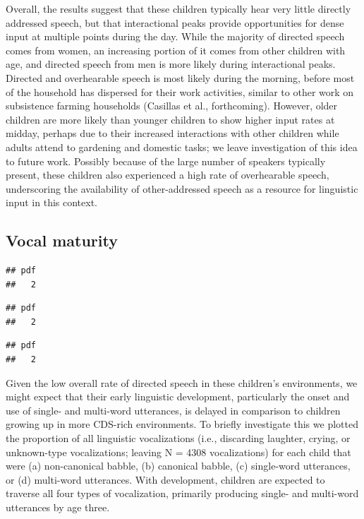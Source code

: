 \documentclass[,man,floatsintext]{apa6}
\begin{document}
Overall, the results suggest that these children typically hear very
little directly addressed speech, but that interactional peaks provide
opportunities for dense input at multiple points during the day. While
the majority of directed speech comes from women, an increasing portion
of it comes from other children with age, and directed speech from men
is more likely during interactional peaks. Directed and overhearable
speech is most likely during the morning, before most of the household
has dispersed for their work activities, similar to other work on
subsistence farming households (Casillas et al., forthcoming). However,
older children are more likely than younger children to show higher
input rates at midday, perhaps due to their increased interactions with
other children while adults attend to gardening and domestic tasks; we
leave investigation of this idea to future work. Possibly because of the
large number of speakers typically present, these children also
experienced a high rate of overhearable speech, underscoring the
availability of other-addressed speech as a resource for linguistic
input in this context.

\subsection{Vocal maturity}\label{vocal-maturity}

\begin{verbatim}
## pdf 
##   2
\end{verbatim}

\begin{verbatim}
## pdf 
##   2
\end{verbatim}

\begin{verbatim}
## pdf 
##   2
\end{verbatim}

Given the low overall rate of directed speech in these children's
environments, we might expect that their early linguistic development,
particularly the onset and use of single- and multi-word utterances, is
delayed in comparison to children growing up in more CDS-rich
environments. To briefly investigate this we plotted the proportion of
all linguistic vocalizations (i.e., discarding laughter, crying, or
unknown-type vocalizations; leaving N = 4308 vocalizations) for each
child that were (a) non-canonical babble, (b) canonical babble, (c)
single-word utterances, or (d) multi-word utterances. With development,
children are expected to traverse all four types of vocalization,
primarily producing single- and multi-word utterances by age three.
\end{document}
